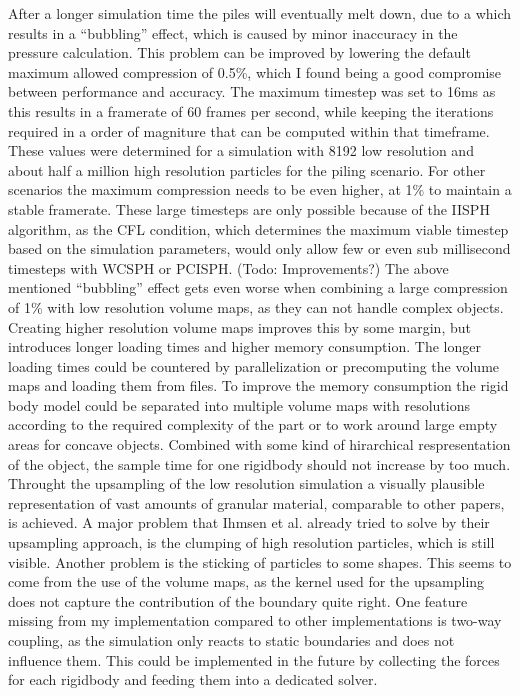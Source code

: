 \documentclass[intern]{cgMA}
\begin{document}
    After a longer simulation time the piles will eventually melt down, due to a which results in a \enquote{bubbling} effect, which is caused by minor inaccuracy in the pressure calculation. This problem can be improved by lowering the default maximum allowed compression of 0.5\%, which I found being a good compromise between performance and accuracy. The maximum timestep was set to 16ms as this results in a framerate of 60 frames per second, while keeping the iterations required in a order of magniture that can be computed within that timeframe. These values were determined for a simulation with 8192 low resolution and about half a million high resolution particles for the piling scenario. For other scenarios the maximum compression needs to be even higher, at 1\% to maintain a stable framerate.
    These large timesteps are only possible because of the IISPH algorithm, as the CFL condition, which determines the maximum viable timestep based on the simulation parameters, would only allow few or even sub millisecond timesteps with WCSPH or PCISPH. (Todo: Improvements?)
    The above mentioned \enquote{bubbling} effect gets even worse when combining a large compression of 1\% with low resolution volume maps, as they can not handle complex objects. Creating higher resolution volume maps improves this by some margin, but introduces longer loading times and higher memory consumption. The longer loading times could be countered by parallelization or precomputing the volume maps and loading them from files. To improve the memory consumption the rigid body model could be separated into multiple volume maps with resolutions according to the required complexity of the part or to work around large empty areas for concave objects. Combined with some kind of hirarchical respresentation of the object, the sample time for one rigidbody should not increase by too much.
    Throught the upsampling of the low resolution simulation a visually plausible representation of vast amounts of granular material, comparable to other papers, is achieved. A major problem that Ihmsen et al. \cite{10.2312:PE:vriphys:vriphys12:053-060} already tried to solve by their upsampling approach, is the clumping of high resolution particles, which is still visible. Another problem is the sticking of particles to some shapes. This seems to come from the use of the volume maps, as the kernel used for the upsampling does not capture the contribution of the boundary quite right.
    One feature missing from my implementation compared to other implementations is two-way coupling, as the simulation only reacts to static boundaries and does not influence them. This could be implemented in the future by collecting the forces for each rigidbody and feeding them into a dedicated solver.

    \pagebreak
    \listoffigures
    \pagebreak
    \printbibliography
\end{document}
